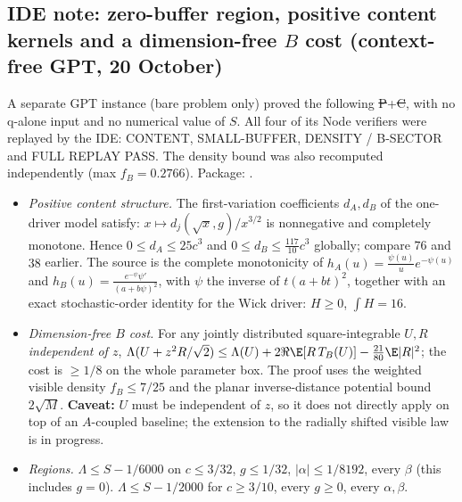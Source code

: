 \subsection{IDE note: zero-buffer region, positive content kernels and a dimension-free $B$ cost (context-free GPT, 20 October)}\label{sec:zero-buffer-cold}
A separate GPT instance (bare problem only) proved the following \st{P}+\st{C}, with no q-alone input and no numerical value of $S$. All four of its Node verifiers were replayed by the IDE:
CONTENT, SMALL-BUFFER, DENSITY / B-SECTOR and FULL REPLAY PASS. The density bound was also recomputed independently (max $f_B=0.2766$). Package:
.
\begin{itemize}
\item \emph{Positive content structure.} The first-variation coefficients $d_A,d_B$ of the one-driver model satisfy: $x\mapsto d_j(\sqrt x,g)/x^{3/2}$ is nonnegative and completely
monotone. Hence $0\le d_A\le25c^3$ and $0\le d_B\le\tfrac{117}{10}c^3$ globally; compare $76$ and $38$ earlier. The source is the complete monotonicity of $h_A(u)=\frac{\psi(u)}ue^{-\psi(u)}$ and
$h_B(u)=\frac{e^{-\psi}\psi'}{(a+b\psi)^2}$, with $\psi$ the inverse of $t(a+bt)^2$, together with an exact stochastic-order identity for the Wick driver: $H\ge0$, $\int H=16$.
\item \emph{Dimension-free $B$ cost.} For any jointly distributed square-integrable $U,R$ \emph{independent of $z$},
$\Lambda(U+z^2R/\sqrt2)\le\Lambda(U)+2\Re\E[R\,T_B(U)]-\tfrac{21}{80}\E|R|^2$; the cost is $\ge1/8$ on the whole parameter box. The proof uses the weighted visible density
$f_B\le7/25$ and the planar inverse-distance potential bound $2\sqrt M$. \textbf{Caveat:} $U$ must be independent of $z$, so it does not directly apply on top of an $A$-coupled baseline; the
extension to the radially shifted visible law is in progress.
\item \emph{Regions.} $\Lambda\le S-1/6000$ on $c\le3/32$, $g\le1/32$, $|\alpha|\le1/8192$, every $\beta$ (this includes $g=0$). $\Lambda\le S-1/2000$ for $c\ge3/10$, every $g\ge0$, every
$\alpha,\beta$.
\end{itemize}

